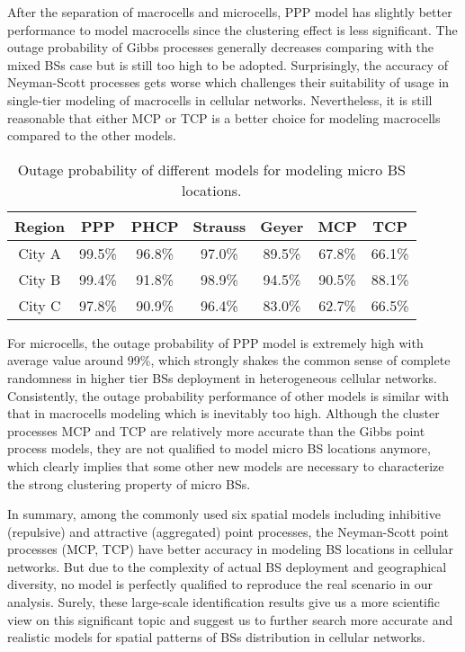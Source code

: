 After the separation of macrocells and microcells, PPP model has slightly better performance to model macrocells since the clustering effect is less significant. The outage probability of Gibbs processes generally decreases comparing with the mixed BSs case but is still too high to be adopted. Surprisingly, the accuracy of Neyman-Scott processes gets worse which challenges their suitability of usage in single-tier modeling of macrocells in cellular networks. Nevertheless, it is still reasonable that either MCP or TCP is a better choice for modeling macrocells compared to the other models.

\begin{table}[htbp]
  \centering
  \caption{Outage probability of different models for modeling micro BS locations.}
    \begin{tabular}{ccccccc}
    \toprule
    Region & PPP  & PHCP & Strauss & Geyer & MCP & TCP\\
    \midrule
    City A & 99.5\% & 96.8\% & 97.0\% & 89.5\% & 67.8\%  & 66.1\% \\
    City B & 99.4\% & 91.8\%  & 98.9\%   & 94.5\% & 90.5\%  & 88.1\% \\
    City C & 97.8\% & 90.9\% & 96.4\%  & 83.0\% & 62.7\%  & 66.5\% \\
    \bottomrule
    \end{tabular}%
  \label{micro_out}%
\end{table}%

For microcells, the outage probability of PPP model is extremely high with average value around 99\%, which strongly shakes the common sense of complete randomness in higher tier BSs deployment in heterogeneous cellular networks. Consistently, the outage probability performance of other models is similar with that in macrocells modeling which is inevitably too high. Although the cluster processes MCP and TCP are relatively more accurate than the Gibbs point process models, they are not qualified to model micro BS locations anymore, which clearly implies that some other new models are necessary to characterize the strong clustering property of micro BSs.

In summary, among the commonly used six spatial models including inhibitive (repulsive) and attractive (aggregated) point processes, the Neyman-Scott point processes (MCP, TCP) have better accuracy in modeling BS locations in cellular networks. But due to the complexity of actual BS deployment and geographical diversity, no model is perfectly qualified to reproduce the real scenario in our analysis. Surely, these large-scale identification results give us a more scientific view on this significant topic and suggest us to further search more accurate and realistic models for spatial patterns of BSs distribution in cellular networks.
